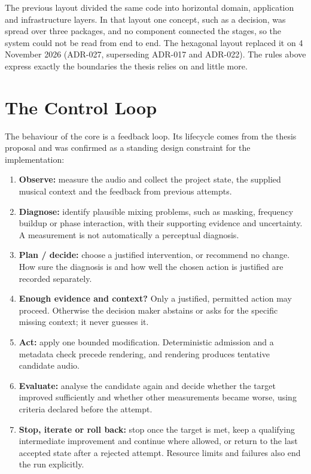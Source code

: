 The previous layout divided the same code into horizontal domain, application and infrastructure layers. In that layout one concept, such as a decision, was spread over three packages, and no component connected the stages, so the system could not be read from end to end. The hexagonal layout replaced it on 4 November 2026 (ADR-027, superseding ADR-017 and ADR-022). The rules above express exactly the boundaries the thesis relies on and little more.

\section{The Control Loop}
\label{sec:arch-loop}

The behaviour of the core is a feedback loop. Its lifecycle comes from the thesis proposal and was confirmed as a standing design constraint for the implementation:

\begin{enumerate}
	\item \textbf{Observe:} measure the audio and collect the project state, the supplied musical context and the feedback from previous attempts.
	\item \textbf{Diagnose:} identify plausible mixing problems, such as masking, frequency buildup or phase interaction, with their supporting evidence and uncertainty. A measurement is not automatically a perceptual diagnosis.
	\item \textbf{Plan / decide:} choose a justified intervention, or recommend no change. How sure the diagnosis is and how well the chosen action is justified are recorded separately.
	\item \textbf{Enough evidence and context?} Only a justified, permitted action may proceed. Otherwise the decision maker abstains or asks for the specific missing context; it never guesses it.
	\item \textbf{Act:} apply one bounded modification. Deterministic admission and a metadata check precede rendering, and rendering produces tentative candidate audio.
	\item \textbf{Evaluate:} analyse the candidate again and decide whether the target improved sufficiently and whether other measurements became worse, using criteria declared before the attempt.
	\item \textbf{Stop, iterate or roll back:} stop once the target is met, keep a qualifying intermediate improvement and continue where allowed, or return to the last accepted state after a rejected attempt. Resource limits and failures also end the run explicitly.
\end{enumerate}

